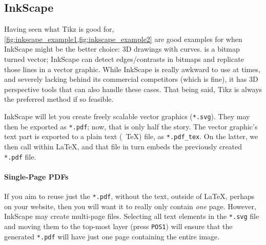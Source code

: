 \subsection{InkScape}
Having seen what Tikz is good for, \cref{fig:inkscape_example1,fig:inkscape_example2} are good examples for when InkScape might be the better choice: 3D drawings with curves.
 is a bitmap turned vector; InkScape can detect edges/contrasts in bitmaps and replicate those lines in a vector graphic.
While InkScape is really awkward to use at times, and severely lacking behind its commercial competitors (which is fine), it has 3D perspective tools that can also handle these cases.
That being said, Tikz is always the preferred method if so feasible.

InkScape will let you create freely scalable vector graphics (\texttt{*.svg}).
They may then be exported as \texttt{*.pdf}; now, that is only half the story.
The vector graphic's text part is exported to a plain text (\ \TeX) file, as \verb|*.pdf_tex|.
On the latter, we then call \verb|| within \LaTeX{}, and that file in turn embeds the previously created \texttt{*.pdf} file.

\paragraph{Single-Page PDFs}
If you aim to reuse just the \texttt{*.pdf}, without the text, outside of \LaTeX{}, perhaps on your website, then you will want it to really only contain \emph{one} page.
However, InkScape may create multi-page files.
Selecting all text elements in the \texttt{*.svg} file and moving them to the top-most layer (press \texttt{POS1}) will ensure that the generated \texttt{*.pdf} will have just one page containing the entire image.
\begin{figure}\ContinuedFloat*
{}%
{%
	\small
	\def\svgwidth{0.6\figurewidth}
	
}%
\end{figure}%
\begin{figure}\ContinuedFloat
	{%
		\small
		\def\svgwidth{0.6\figurewidth}
		
	}%
\end{figure}%
